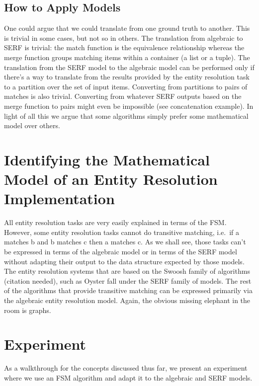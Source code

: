 \documentclass[11pt]{article}
\begin{document}
    \subsection[applying]{How to Apply Models}\label{sub-sec:applying}

    One could argue that we could translate from one ground truth to another. This is trivial in some cases, but not so in others. The translation from algebraic to SERF is trivial: the match function is the equivalence relationship whereas the merge function groups matching items within a container (a list or a tuple). The translation from the SERF model to the algebraic model can be performed only if there's a way to translate from the results provided by the entity resolution task to a partition over the set of input items. Converting from partitions to pairs of matches is also trivial. Converting from whatever SERF outputs based on the merge function to pairs might even be impossible (see concatenation example). In light of all this we argue that some algorithms simply prefer some mathematical model over others.

    \section{Identifying the Mathematical Model of an Entity Resolution Implementation}\label{section:implementation}
    
    All entity resolution tasks are very easily explained in terms of the FSM\@. However, some entity resolution tasks cannot do transitive matching, i.e.\ if a matches b and b matches c then a matches c. 
    As we shall see, those tasks can't be expressed in terms of the algebraic model or in terms of the SERF model without adapting their output to the data structure expected by those models. The entity resolution systems that are based on the Swoosh family of algorithms (citation needed), such as Oyster fall under the SERF family of models. The rest of the algorithms that provide transitive matching can be expressed primarily via the algebraic entity resolution model. Again, the obvious missing elephant in the room is graphs.

    \section{Experiment}\label{section:experiment}

    As a walkthrough for the concepts discussed thus far, we present an experiment where we use an FSM algorithm and adapt it to the algebraic and SERF models.
\end{document}
